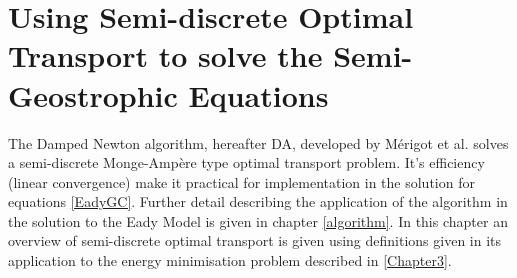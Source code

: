 \chapter{Using Semi-discrete Optimal Transport to solve the Semi-Geostrophic Equations \label{OptimalTransport}}
The Damped Newton algorithm, hereafter DA, developed by M\'{e}rigot et al. \cite{Merigot2017} solves a semi-discrete Monge-Amp\`{e}re type optimal transport problem. It's efficiency (linear convergence) \cite{Kitagawa2016} make it practical for implementation in the solution for equations \ref{EadyGC}. Further detail describing the application of the algorithm in the solution to the Eady Model is given in chapter \ref{algorithm}. In this chapter an overview of semi-discrete optimal transport is given using definitions given in \cite{Kitagawa2016, Merigot2017} its application to the energy minimisation problem described in \ref{Chapter3}.
